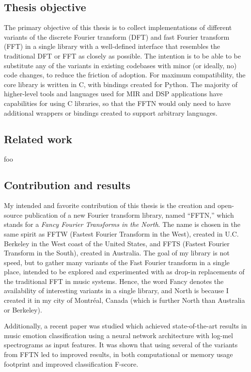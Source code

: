 \documentclass[letter,12pt]{article}
\begin{document}
\subsection{Thesis objective}

The primary objective of this thesis is to collect implementations of different variants of the discrete Fourier transform (DFT) and fast Fourier transform (FFT) in a single library with a well-defined interface that resembles the traditional DFT or FFT as closely as possible. The intention is to be able to be substitute any of the variants in existing codebases with minor (or ideally, no) code changes, to reduce the friction of adoption. For maximum compatibility, the core library is written in C, with bindings created for Python. The majority of higher-level tools and languages used for MIR and DSP applications have capabilities for using C libraries, so that the FFTN would only need to have additional wrappers or bindings created to support arbitrary languages. 

\subsection{Related work}

foo

\subsection{Contribution and results}

My intended and favorite contribution of this thesis is the creation and open-source publication of a new Fourier transform library, named ``FFTN,'' which stands for a \textit{Fancy Fourier Transforms in the North}. The name is chosen in the same spirit as FFTW (Fastest Fourier Transform in the West), created in U.C. Berkeley in the West coast of the United States, and FFTS (Fastest Fourier Transform in the South), created in Australia.  The goal of my library is not speed, but to gather many variants of the Fast Fourier transform in a single place, intended to be explored and experimented with as drop-in replacements of the traditional FFT in music systems. Hence, the word Fancy denotes the availability of interesting variants in a single library, and North is because I created it in my city of Montr{\'e}al, Canada (which is further North than Australia or Berkeley).

Additionally, a recent paper \cite{emomucs} was studied which achieved state-of-the-art results in music emotion classification using a neural network architecture with log-mel spectrograms as input features. It was shown that using several of the variants from FFTN led to improved results, in both computational or memory usage footprint and improved classification F-score.
\end{document}
